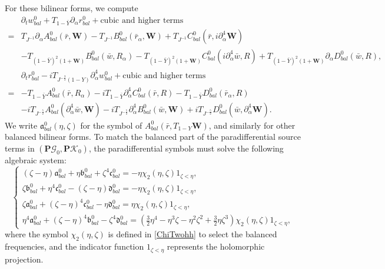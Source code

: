 \documentclass[10pt]{amsart}
\theoremstyle{remark}
\theoremstyle{definition}
\numberwithin{equation}{section}
\newcommand{\p}{\partial}
\newcommand{\al}{\alpha}
\newcommand{\f}{\frac}
\newcommand{\bw}{\mathbf{W}}
\newcommand{\nP}{{\mathbf P}}
\begin{document}
For these bilinear forms, we compute
\begin{align*}
&\partial_t w^0_{bal}+T_{1-\bar{Y}} \partial_\alpha r^0_{bal} + \text{cubic and higher terms} \\
=& T_{J^{-1}}\partial_\alpha A^0_{bal}(\bar{r}, \bw) -T_{J^{-1}}B^0_{bal}(\bar{r}_\alpha, \bw) +  T_{J^{-1}}C^0_{bal}(\bar{r}, i\p_\al^4\bw) \\
 &-T_{(1-\bar{Y})^2(1+\bw)}B^0_{bal}(\bar{w}, R_\alpha)- T_{(1-\bar{Y})^2(1+\bw)}C^0_{bal}(i\p_\al^4\bar{w}, R) + T_{(1-\bar{Y})^2(1+\bw)}\partial_\alpha D^0_{bal}(\bar{w}, R),\\
&\partial_t r^0_{bal}  -iT_{J^{-\frac{3}{2}}(1-Y)}\p_\al^4 w^0_{bal}+ \text{cubic and higher  terms} \\
=& -T_{1-\bar{Y}}A^0_{bal}(\bar{r}, R_\alpha) - iT_{1-\bar{Y}}\partial_\alpha^4 C^0_{bal}(\bar{r}, R) - T_{1-\bar{Y}}D^0_{bal}(\bar{r}_\alpha, R)\\
&- iT_{J^{-\frac{5}{2}}}A^0_{bal}(\p_\al^4\bar{w}, \bw) -iT_{J^{-\frac{5}{2}}}\partial_\alpha^4 B^0_{bal}(\bar{w}, \bw) +iT_{J^{-\frac{5}{2}}}D^0_{bal}(\bar{w}, \p_\al^4\bw).
\end{align*}
We write $\mathfrak{a}^0_{bal}(\eta, \zeta)$ for the symbol of $A^0_{bal}(\bar{r}, T_{1-Y}\bw)$, and similarly for other balanced bilinear forms.
To match the balanced part of the paradifferential source terms in $(\nP\mathcal{G}_0, \nP\mathcal{K}_0)$, the paradifferential symbols must solve the following algebraic system: 
\begin{equation*}
\begin{cases}
(\zeta-\eta)\mathfrak{a}^{0}_{bal}+\eta\mathfrak{b}^{0}_{bal}+\zeta^4\mathfrak{c}^{0}_{bal}=-\eta\chi_{2}(\eta,\zeta)1_{\zeta<\eta},\\
\zeta\mathfrak{b}^{0}_{bal}+\eta^4\mathfrak{c}^{0}_{bal}-(\zeta-\eta)\mathfrak{d}^{0}_{bal}=-\eta\chi_{2}(\eta,\zeta)1_{\zeta<\eta},\\
\zeta\mathfrak{a}^{0}_{bal}+(\zeta-\eta)^4\mathfrak{c}^{0}_{bal}-\eta\mathfrak{d}^{0}_{bal}=\eta\chi_{2}(\eta,\zeta)1_{\zeta<\eta},\\
\eta^4 \mathfrak{a}^{0}_{bal}+(\zeta-\eta)^4\mathfrak{b}^{0}_{bal}-\zeta^4\mathfrak{d}^{0}_{bal}=\left(\f32\eta^4-\eta^3\zeta-\eta^2\zeta^2+\f32\eta\zeta^3\right)\chi_{2}(\eta,\zeta)1_{\zeta<\eta},
\end{cases}
\end{equation*}
where  the symbol $\chi_{2}(\eta, \zeta)$ is defined in \eqref{ChiTwohh} to select the balanced frequencies, and the indicator function $1_{\zeta<\eta}$ represents the holomorphic projection.
\end{document}
